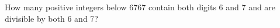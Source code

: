 How many positive integers below 6767 contain both digits 6 and 7 and are divisible by both 6 and 7?
